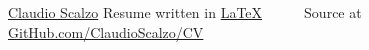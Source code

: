\documentclass[11pt, a4paper]{awesome-cv}
\begin{document}
\makecvheader[L]

\makecvfooter
  {\href{https://www.linkedin.com/in/claudioscalzo}{Claudio Scalzo}}
  {}
  {Resume written in \href{https://www.latex-project.org}{\LaTeX}~~~\textbullet~~~Source at \href{https://github.com/claudioscalzo/cv}{GitHub.com/ClaudioScalzo/CV}}








\end{document}
